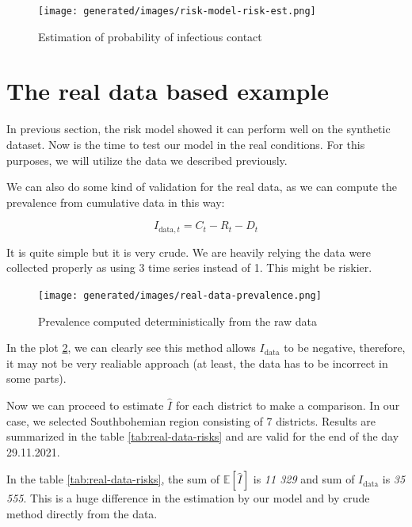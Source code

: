 \documentclass[
  digital, %
  oneside, %
  lof,     %
  lot,     %
]{fithesis4}
\begin{document}
\begin{figure}[H]
  \begin{center}
    \texttt{[image: generated/images/risk-model-risk-est.png]}
  \end{center}
  \caption{Estimation of probability of infectious contact}
  \label{fig:risk-model-risk-est}
\end{figure}


\section{The real data based example}

In previous section, the risk model showed
it can perform well on the synthetic dataset.
Now is the time to test our model in the real conditions.
For this purposes, we will utilize the data we
described previously.

We can also do some kind of validation for the real data,
as we can compute the prevalence from cumulative data in
this way:

\begin{equation}
  I_{\text{data},t} = C_t - R_t - D_t
\end{equation}

It is quite simple but it is very crude.
We are heavily relying the data were 
collected properly as using 3 time series
instead of 1. This might be riskier.

\begin{figure}[H]
  \begin{center}
    \texttt{[image: generated/images/real-data-prevalence.png]}
  \end{center}
  \caption{Prevalence computed deterministically from the raw data}
  \label{fig:real-data-prevalence}
\end{figure}

In the plot \ref{fig:real-data-prevalence}, we can clearly
see this method allows $I_{\text{data}}$ to be negative, 
therefore, it may not be very realiable approach
(at least, the data has to be incorrect in some parts).

Now we can proceed to estimate $\hat{I}$ for 
each district to make a comparison.
In our case, we selected Southbohemian region
consisting of 7 districts.
Results are summarized in the 
table \ref{tab:real-data-risks} and are 
valid for the end of the day 29.11.2021.



In the table \ref{tab:real-data-risks}, 
the sum of $\mathbb{E}[\hat{I}]$ is \textit{11 329} and 
sum of $I_\text{data}$ is \textit{35 555}.
This is a huge difference in the estimation by our 
model and by crude method directly from the data.
\end{document}
